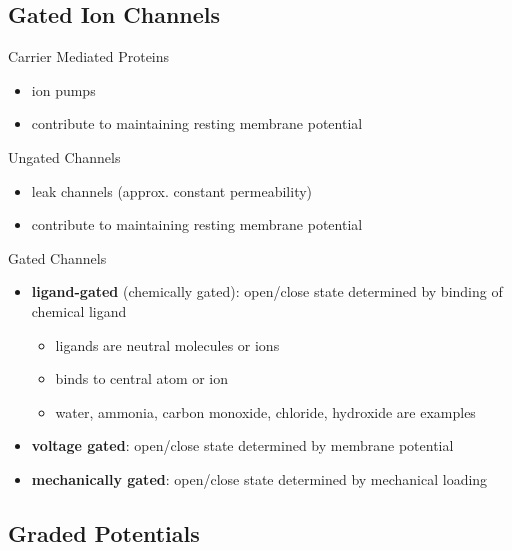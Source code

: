 \documentclass[11pt,fleqn]{book}
\begin{document}
\subsection{Gated Ion Channels}
\begin{descriptions}
    \item[Carrier Mediated Proteins]\begin{descriptions}
    \end{descriptions} 
    \begin{itemize}
        \item ion pumps
        \item contribute to maintaining resting membrane potential
    \end{itemize}
    \item[Ungated Channels]\begin{descriptions}
    \end{descriptions}    
    \begin{itemize}
        \item leak channels (approx. constant permeability)
        \item contribute to maintaining resting membrane potential
    \end{itemize}
    \item[Gated Channels]\begin{descriptions}
    \end{descriptions}
    \begin{itemize}
        \item \textbf{ligand-gated} (chemically gated): open/close state determined by binding of chemical ligand
        \begin{itemize}
            \item ligands are neutral molecules or ions
            \item binds to central atom or ion
            \item water, ammonia, carbon monoxide, chloride, hydroxide are examples
        \end{itemize}
        \item \textbf{voltage gated}: open/close state determined by membrane potential
        \item \textbf{mechanically gated}: open/close state determined by mechanical loading
    \end{itemize}
\end{descriptions}
\subsection{Graded Potentials}
\end{document}
